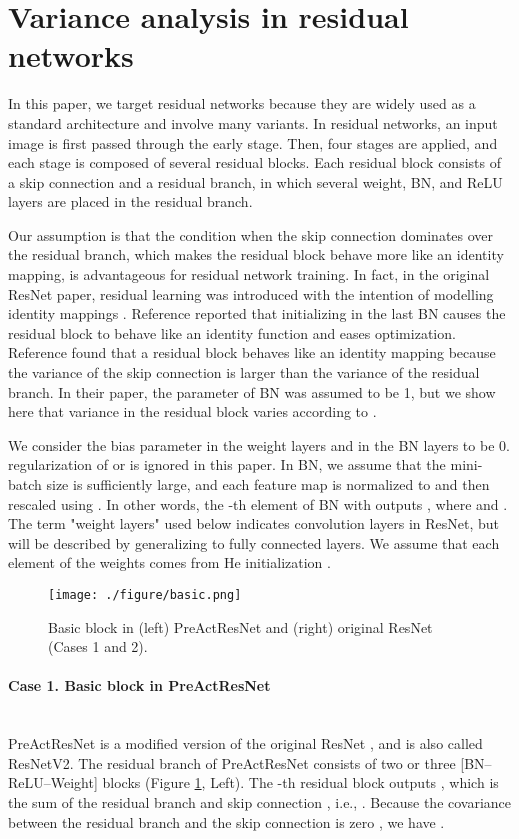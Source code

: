 \documentclass{article}
\begin{document}
\section{Variance analysis in residual networks}
\label{sec:varianceanalysisinresidualnetworks}
In this paper, we target residual networks because they are widely used as a standard architecture and involve many variants. In residual networks, an input image is first passed through the early stage. Then, four stages are applied, and each stage is composed of several residual blocks. Each residual block consists of a skip connection and a residual branch, in which several weight, BN, and ReLU layers are placed in the residual branch.

Our assumption is that the condition when the skip connection dominates over the residual branch, which makes the residual block behave more like an identity mapping, is advantageous for residual network training. In fact, in the original ResNet paper, residual learning was introduced with the intention of modelling identity mappings \cite{gcvpr/HeZRS16}. Reference \cite{gcorr/GoyalDGNWKTJH17} reported that initializing  in the last BN causes the residual block to behave like an identity function and eases optimization. Reference \cite{gnips/DeS20} found that a residual block behaves like an identity mapping because the variance of the skip connection is larger than the variance of the residual branch. In their paper, the  parameter of BN was assumed to be 1, but we show here that variance in the residual block varies according to .

We consider the bias parameter  in the weight layers and  in the BN layers to be 0.  regularization of  or  is ignored in this paper. In BN, we assume that the mini-batch size is sufficiently large, and each feature map is normalized to  and then rescaled using . In other words, the -th element of BN with  outputs , where  and . The term "weight layers" used below indicates convolution layers in ResNet, but will be described by generalizing to fully connected layers. We assume that each element of the weights comes from He initialization  \cite{giccv/HeZRS15}.

\begin{figure}[t!]
	\centering
    \texttt{[image: ./figure/basic.png]}
\caption{Basic block in (left) PreActResNet and (right) original ResNet (Cases 1 and 2).}
	\label{fig:basic}
\end{figure}

\paragraph{Case 1. Basic block in PreActResNet} \ \\
PreActResNet \cite{geccv/HeZRS16} is a modified version of the original ResNet \cite{gcvpr/HeZRS16}, and is also called ResNetV2. The residual branch of PreActResNet consists of two or three [BN--ReLU--Weight] blocks (Figure \ref{fig:basic}, Left). The -th residual block outputs , which is the sum of the residual branch  and skip connection , i.e., . Because the covariance between the residual branch and the skip connection is zero \cite{gnips/DeS20}, we have .
\end{document}
